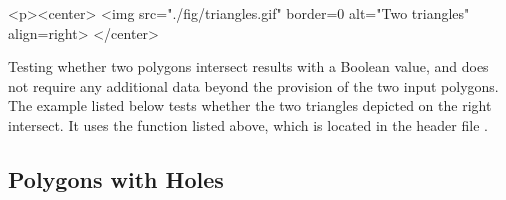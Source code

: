 \lcTex{%
  \vspace{-20pt}
  \setlength{\widthRight}{1.4cm}
  \setlength{\widthLeft}{\widthLineReal}
  \addtolength{\widthLeft}{-\widthRight}
  \begin{minipage}{\widthLeft}
}
\label{fig:example}
\begin{ccHtmlOnly}
  <p><center>
    <img src="./fig/triangles.gif" border=0 alt="Two triangles" align=right>
  </center>
\end{ccHtmlOnly}
Testing whether two polygons intersect results with a Boolean value, 
and does not require any additional data beyond the provision of the 
two input polygons. The example listed below tests whether the two
triangles depicted on the right intersect. It uses the function
 listed above, which is located in the header file
.

\lcTex{\vspace{-20pt}}

\subsection{Polygons with Holes}
\label{bops_ssec:polygons_with_holes}

